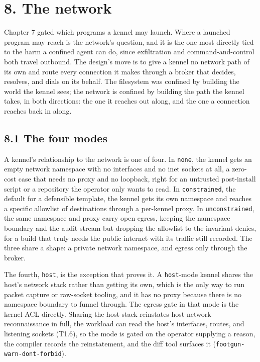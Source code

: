 \hypertarget{the-network}{%
\chapter{8. The network}\label{the-network}}

Chapter 7 gated which programs a kennel may launch. Where a launched
program may reach is the network's question, and it is the one most
directly tied to the harm a confined agent can do, since exfiltration
and command-and-control both travel outbound. The design's move is to
give a kennel no network path of its own and route every connection it
makes through a broker that decides, resolves, and dials on its behalf.
The filesystem was confined by building the world the kennel sees; the
network is confined by building the path the kennel takes, in both
directions: the one it reaches out along, and the one a connection
reaches back in along.

\hypertarget{the-four-modes}{%
\section{8.1 The four modes}\label{the-four-modes}}

A kennel's relationship to the network is one of four. In \texttt{none},
the kennel gets an empty network namespace with no interfaces and no
inet sockets at all, a zero-cost case that needs no proxy and no
loopback, right for an untrusted post-install script or a repository the
operator only wants to read. In \texttt{constrained}, the default for a
defensible template, the kennel gets its own namespace and reaches a
specific allowlist of destinations through a per-kennel proxy. In
\texttt{unconstrained}, the same namespace and proxy carry open egress,
keeping the namespace boundary and the audit stream but dropping the
allowlist to the invariant denies, for a build that truly needs the
public internet with its traffic still recorded. The three share a
shape: a private network namespace, and egress only through the broker.

The fourth, \texttt{host}, is the exception that proves it. A
\texttt{host}-mode kennel shares the host's network stack rather than
getting its own, which is the only way to run packet capture or
raw-socket tooling, and it has no proxy because there is no namespace
boundary to funnel through. The egress gate in that mode is the kernel
ACL directly. Sharing the host stack reinstates host-network
reconnaissance in full, the workload can read the host's interfaces,
routes, and listening sockets (T1.6), so the mode is gated on the
operator supplying a reason, the compiler records the reinstatement, and
the diff tool surfaces it (\texttt{footgun-warn-dont-forbid}).

